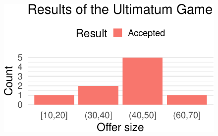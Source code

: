 \documentclass[
  letterpaper,
]{book}
\begin{document}
\begin{figure}[H]

{\centering \includegraphics{./qualtrics_api_files/figure-pdf/unnamed-chunk-8-1.pdf}

}

\end{figure}
\end{document}

